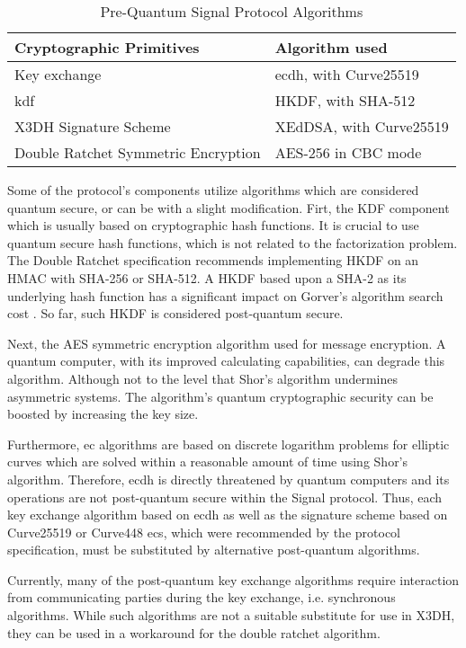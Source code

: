 \begin{table}[htbp]
	\centering
	\caption{Pre-Quantum Signal Protocol Algorithms}
	\label{tab:signal-alg}
	\begin{tabular}{!{\color{black}\vrule}l!{\color{black}\vrule}l!{\color{black}\vrule}} 
		\hline
			Cryptographic Primitives            & Algorithm used           \\ 
		\hline
		\hline
		Key exchange                        & \acrshort{ecdh}, with Curve25519    \\ 
		\hline
		\gls{kdf}                           & HKDF, with SHA-512       \\ 
		\hline
		X3DH Signature Scheme               & XEdDSA, with Curve25519  \\ 
		\hline
		Double Ratchet Symmetric Encryption & AES-256 in CBC mode      \\
		\hline
	\end{tabular}
\end{table}
Some of the protocol's components utilize algorithms which are considered quantum secure, or can be with a slight modification.  
Firt, the KDF component which is usually based on cryptographic hash functions. It is crucial to use quantum secure hash functions, which is not related to the factorization problem. The Double Ratchet specification recommends implementing HKDF on an HMAC with SHA-256 or SHA-512. A HKDF based upon a SHA-2 as its underlying hash function has a significant impact on Gorver's algorithm search cost \cite{bogomolec2019towards}. So far, such HKDF is considered post-quantum secure.
\par
Next, the AES symmetric encryption algorithm used for message encryption. A quantum computer, with its improved calculating capabilities, can degrade this algorithm. Although not to the level that Shor's algorithm undermines asymmetric systems. The algorithm's quantum cryptographic security can be boosted by increasing the key size.
\par
Furthermore, \gls{ec} algorithms are based on discrete logarithm problems for elliptic curves which are solved within a reasonable amount of time using Shor’s algorithm. Therefore, \gls{ecdh} is directly threatened by quantum computers and its operations are not post-quantum secure within the Signal protocol. Thus, each key exchange algorithm based on \gls{ecdh} as well as the signature scheme based on Curve25519 or Curve448 \glspl{ec}, which were recommended by the protocol specification, must be substituted by alternative post-quantum algorithms. 
\par
Currently, many of the post-quantum key exchange algorithms require interaction from communicating parties during the key exchange, i.e. synchronous algorithms. While such algorithms are not a suitable substitute for use in X3DH, they can be used in a workaround for the double ratchet algorithm.

